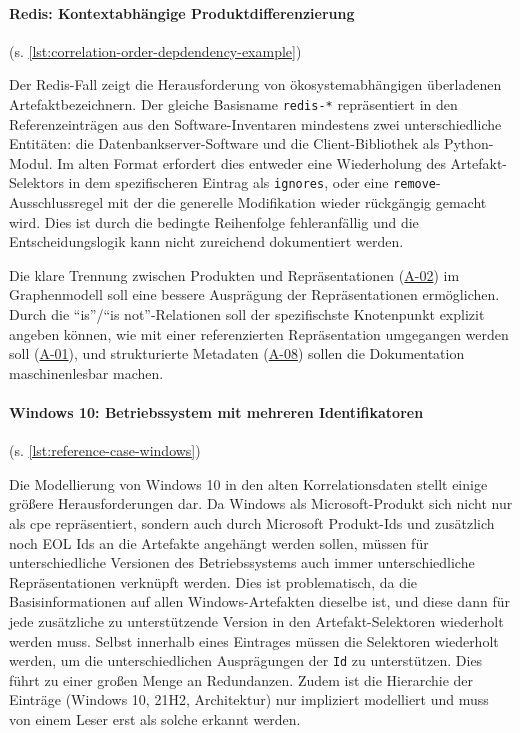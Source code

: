 \paragraph{Redis: Kontextabhängige Produktdifferenzierung}\label{par:reference-case-redis} (s. \autoref{lst:correlation-order-depdendency-example})

Der Redis-Fall zeigt die Herausforderung von ökosystemabhängigen überladenen Artefaktbezeichnern.
Der gleiche Basisname \texttt{redis-*} repräsentiert in den Referenzeinträgen aus den Software-Inventaren mindestens zwei unterschiedliche Entitäten: die Datenbankserver-Software und die Client-Bibliothek als Python-Modul.
Im alten Format erfordert dies entweder eine Wiederholung des Artefakt-Selektors in dem spezifischeren Eintrag als \texttt{ignores}, oder eine \texttt{remove}-Ausschlussregel mit der die generelle Modifikation wieder rückgängig gemacht wird.
Dies ist durch die bedingte Reihenfolge fehleranfällig und die Entscheidungslogik kann nicht zureichend dokumentiert werden.

Die klare Trennung zwischen Produkten und Repräsentationen (\hyperref[subsec:req-product-concept]{A-02}) im Graphenmodell soll eine bessere Ausprägung der Repräsentationen ermöglichen.
Durch die \enquote{is}/\enquote{is not}-Relationen soll der spezifischste Knotenpunkt explizit angeben können, wie mit einer referenzierten Repräsentation umgegangen werden soll (\hyperref[subsec:req-format-product-graph]{A-01}), und strukturierte Metadaten (\hyperref[subsec:req-reason-format]{A-08}) sollen die Dokumentation maschinenlesbar machen.

\paragraph{Windows 10: Betriebssystem mit mehreren Identifikatoren}\label{par:reference-case-windows} (s. \autoref{lst:reference-case-windows})

Die Modellierung von Windows 10 in den alten Korrelationsdaten stellt einige größere Herausforderungen dar.
Da Windows als Microsoft-Produkt sich nicht nur als \acrshort{cpe} repräsentiert, sondern auch durch Microsoft Produkt-Ids und zusätzlich noch EOL Ids an die Artefakte angehängt werden sollen, müssen für unterschiedliche Versionen des Betriebssystems auch immer unterschiedliche Repräsentationen verknüpft werden.
Dies ist problematisch, da die Basisinformationen auf allen Windows-Artefakten dieselbe ist, und diese dann für jede zusätzliche zu unterstützende Version in den Artefakt-Selektoren wiederholt werden muss.
Selbst innerhalb eines Eintrages müssen die Selektoren wiederholt werden, um die unterschiedlichen Ausprägungen der \texttt{Id} zu unterstützen.
Dies führt zu einer großen Menge an Redundanzen.
Zudem ist die Hierarchie der Einträge (Windows 10, 21H2, Architektur) nur impliziert modelliert und muss von einem Leser erst als solche erkannt werden.

